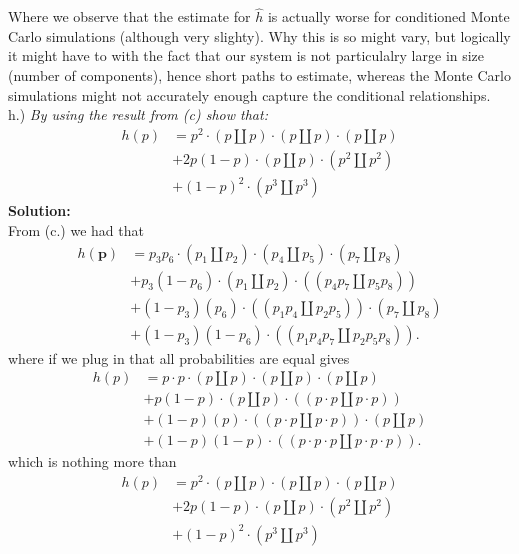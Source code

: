 \documentclass[12pt,
               a4paper,
               article,
               oneside,
               english,oldfontcommands]{memoir}
\newcommand{\spaze}{\vspace{4mm}\\}
\begin{document}
Where we observe that the estimate for $\hat{h}$ is actually worse for conditioned Monte Carlo simulations (although very slighty). Why this is so might vary, but logically it might have to with the fact that our system is not particulalry large in size (number of components), hence short paths to estimate, whereas the Monte Carlo simulations might not accurately enough capture the conditional relationships. \spaze 
h.) \emph{By using the result from (c) show that:}
\begin{align*}
h(p) &= p^2 \cdot \left( p \coprod p \right) \cdot  \left( p \coprod p \right) \cdot  \left( p \coprod p \right) \\[5pt]
&+ 2p(1-p) \cdot \left( p \coprod p \right) \cdot \left( p^2 \coprod p^2 \right) \\[5pt]
&+ (1-p)^2 \cdot \left( p^3 \coprod p^3 \right)
\end{align*}
\textbf{Solution:} \spaze 
From (c.) we had that 
\begin{align*}
h(\bm{p}) &= p_3 p_6 \cdot \left( p_1 \coprod p_2 \right) \cdot \left(p_4 \coprod p_5 \right)\cdot \left(p_7 \coprod p_8 \right) \\[5pt]
&+ p_3 (1- p_6) \cdot \left( p_1 \coprod p_2 \right) \cdot \left( \left( p_4 p_7 \coprod p_5 p_8 \right) \right) \\[5pt]
&+ (1 - p_3 )(p_6) \cdot \left( \left(p_1p_4 \coprod p_2 p_5 \right) \right) \cdot \left( p_7 \coprod p_8 \right) \\[5pt]
&+ (1 - p_3 )(1 - p_6) \cdot \left( \left(p_1p_4p_7 \coprod p_2 p_5 p_8 \right) \right).
\end{align*}
where if we plug in that all probabilities are equal gives 
\begin{align}
h(p) &= p \cdot p \cdot \left( p \coprod p \right) \cdot \left(p \coprod p \right) \cdot \left(p \coprod p \right) \\[5pt]
&+ p (1- p) \cdot \left( p \coprod p \right) \cdot \left( \left( p\cdot p \coprod p \cdot p \right) \right) \\[5pt]
&+ (1 - p )(p) \cdot \left( \left(p \cdot p \coprod p \cdot p \right) \right) \cdot \left( p \coprod p \right) \\[5pt]
&+ (1 - p )(1 - p) \cdot \left( \left(p \cdot p \cdot p \coprod p \cdot p \cdot p \right) \right).
\end{align}
which is nothing more than 
\begin{align*}
h(p) &= p^2 \cdot \left( p \coprod p \right) \cdot  \left( p \coprod p \right) \cdot  \left( p \coprod p \right) \\[5pt]
&+ 2p(1-p) \cdot \left( p \coprod p \right) \cdot \left( p^2 \coprod p^2 \right) \\[5pt]
&+ (1-p)^2 \cdot \left( p^3 \coprod p^3 \right)
\end{align*}
\end{document}
